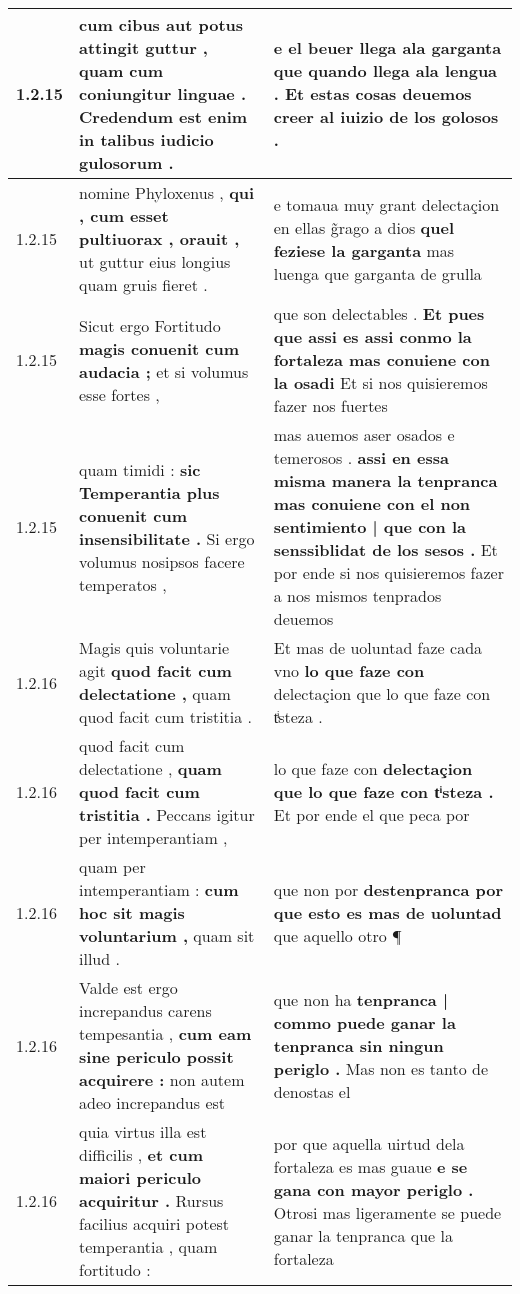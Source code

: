 \begin{tabular}{|p{1cm}|p{6.5cm}|p{6.5cm}|}
1.2.15 & cum cibus aut potus attingit guttur , \textbf{ quam cum coniungitur linguae . } Credendum est enim in talibus iudicio gulosorum . & e el beuer llega ala garganta \textbf{ que quando llega ala lengua . } Et estas cosas deuemos creer al iuizio de los golosos . \\\hline
1.2.15 & nomine Phyloxenus , \textbf{ qui , cum esset pultiuorax , orauit , } ut guttur eius longius quam gruis fieret . & e tomaua muy grant delectaçion en ellas g̃rago a dios \textbf{ quel feziese la garganta } mas luenga que garganta de grulla \\\hline
1.2.15 & Sicut ergo Fortitudo \textbf{ magis conuenit cum audacia ; } et si volumus esse fortes , & que son delectables . \textbf{ Et pues que assi es assi conmo la fortaleza mas conuiene con la osadi } Et si nos quisieremos fazer nos fuertes \\\hline
1.2.15 & quam timidi : \textbf{ sic Temperantia plus conuenit cum insensibilitate . } Si ergo volumus nosipsos facere temperatos , & mas auemos aser osados e temerosos . \textbf{ assi en essa misma manera la tenpranca mas conuiene con el non sentimiento | que con la senssiblidat de los sesos . } Et por ende si nos quisieremos fazer a nos mismos tenprados deuemos \\\hline
1.2.16 & Magis quis voluntarie agit \textbf{ quod facit cum delectatione , } quam quod facit cum tristitia . & Et mas de uoluntad faze cada vno \textbf{ lo que faze con } delectaçion que lo que faze con tͥsteza . \\\hline
1.2.16 & quod facit cum delectatione , \textbf{ quam quod facit cum tristitia . } Peccans igitur per intemperantiam , & lo que faze con \textbf{ delectaçion que lo que faze con tͥsteza . } Et por ende el que peca por \\\hline
1.2.16 & quam per intemperantiam : \textbf{ cum hoc sit magis voluntarium , } quam sit illud . & que non por \textbf{ destenpranca por que esto es mas de uoluntad } que aquello otro ¶ \\\hline
1.2.16 & Valde est ergo increpandus carens tempesantia , \textbf{ cum eam sine periculo possit acquirere : } non autem adeo increpandus est & que non ha \textbf{ tenpranca | commo puede ganar la tenpranca sin ningun periglo . } Mas non es tanto de denostas el \\\hline
1.2.16 & quia virtus illa est difficilis , \textbf{ et cum maiori periculo acquiritur . } Rursus facilius acquiri potest temperantia , quam fortitudo : & por que aquella uirtud dela fortaleza es mas guaue \textbf{ e se gana con mayor periglo . } Otrosi mas ligeramente se puede ganar la tenpranca que la fortaleza \\\hline

\end{tabular}
